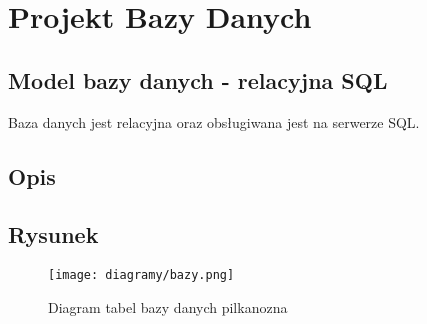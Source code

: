 \section{Projekt Bazy Danych}
    \subsection{Model bazy danych - relacyjna SQL}
        Baza danych jest relacyjna oraz obsługiwana jest na serwerze SQL.
    \subsection{Opis} 

    \subsection{Rysunek}
        \begin{figure}[!htb]
            \centering
            \texttt{[image: diagramy/bazy.png]}
            \caption{Diagram tabel bazy danych pilkanozna}
        \end{figure}